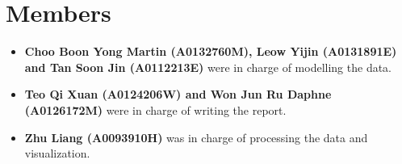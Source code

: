 \documentclass[letterpaper]{article}
\begin{document}
	\section{Members}
	\begin{itemize}
		\item {\bf Choo Boon Yong Martin (A0132760M), Leow Yijin (A0131891E) and Tan Soon Jin (A0112213E)} were in charge of modelling the data.
		\item {\bf Teo Qi Xuan (A0124206W) and Won Jun Ru Daphne (A0126172M)} were in charge of writing the report.
		\item {\bf Zhu Liang (A0093910H)} was in charge of processing the data and visualization.
	\end{itemize}

	
	

	
	


	
	\printbibliography
\end{document}
